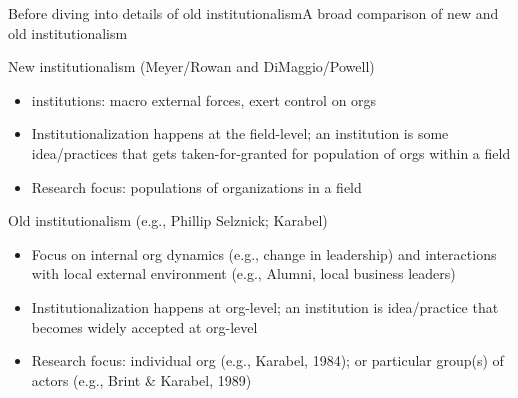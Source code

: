 \begin{frame}{Before diving into details of old institutionalism}{A broad comparison of new and old institutionalism}

	New institutionalism (Meyer/Rowan and DiMaggio/Powell)
	\begin{itemize}
		\item institutions: macro external forces, exert control on orgs
		\item Institutionalization happens at the field-level; an institution is some idea/practices that gets taken-for-granted for population of orgs within a field
		\item Research focus: populations of organizations in a field		
	\end{itemize}	
	\vspace{2mm}	
	Old institutionalism (e.g., Phillip Selznick; Karabel)		
	\begin{itemize}
		\item Focus on internal org dynamics (e.g., change in leadership) and interactions with local external environment (e.g., Alumni, local business leaders)
		\item Institutionalization happens at org-level; an institution is idea/practice that becomes widely accepted at org-level
		\item Research focus: individual org (e.g., Karabel, 1984); or particular group(s) of actors (e.g., Brint \& Karabel, 1989)
		
	\end{itemize}
	
\end{frame}


\begin{comment}
\begin{frame}{Core ideas of old institutionalism}

	Core concern of old institutionalism (Selznick)
	\begin{itemize}
		\item Orgs play important role in promoting societal values (e.g., democracy, equality of opportunity)
		\item Org upholds societal values only if org has mission/values consistent with broader societal values 
		\item Selznick concerned with orgs institutionalizing (at org-level) values/practices that promoted societal ideals
	\end{itemize}
	\vspace{2mm}
	The problem: org values/purpose are ``precarious''
	\begin{itemize}
		\item Change in leadership or org structure may displace values
		\item Coalitions composed of internal/external actors may seek to shift purpose of the org to serve their own interests
		\item Practices that garner resources, prestige may conflict with ideals the org supposed to uphold
	\end{itemize}
\end{frame}

\end{comment}

